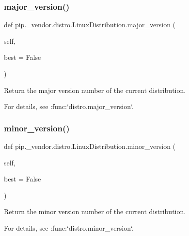 \subsubsection{\texorpdfstring{major\+\_\+version()}{major\_version()}}
{\footnotesize\ttfamily def pip.\+\_\+vendor.\+distro.\+Linux\+Distribution.\+major\+\_\+version (\begin{DoxyParamCaption}\item[{}]{self,  }\item[{}]{best = {\ttfamily False} }\end{DoxyParamCaption})}

\begin{DoxyVerb}Return the major version number of the current distribution.

For details, see :func:`distro.major_version`.
\end{DoxyVerb}
 \mbox{\label{classpip_1_1__vendor_1_1distro_1_1LinuxDistribution_a56ce7b60ce6e6d469ef2ca23999dbbc7}} 
\subsubsection{\texorpdfstring{minor\+\_\+version()}{minor\_version()}}
{\footnotesize\ttfamily def pip.\+\_\+vendor.\+distro.\+Linux\+Distribution.\+minor\+\_\+version (\begin{DoxyParamCaption}\item[{}]{self,  }\item[{}]{best = {\ttfamily False} }\end{DoxyParamCaption})}

\begin{DoxyVerb}Return the minor version number of the current distribution.

For details, see :func:`distro.minor_version`.
\end{DoxyVerb}
 \mbox{\label{classpip_1_1__vendor_1_1distro_1_1LinuxDistribution_a7bbcbb9f1bf561b231f594b5bb251dbc}} 
